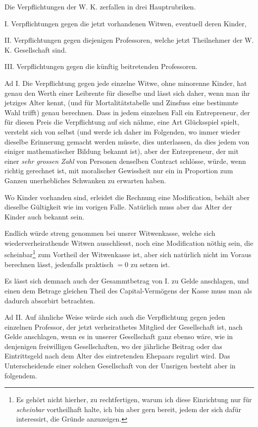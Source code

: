 \par{}
Die Verpflichtungen der W. K. zerfallen in drei Hauptrubriken.

I. Verpflichtungen gegen die jetzt vorhandenen Witwen, eventuell deren Kinder,

II. Verpflichtungen gegen diejenigen Professoren, welche jetzt Theilnehmer der W. K. Gesellschaft sind.

III. Verpflichtungen gegen die künftig beitretenden Professoren.

Ad I. Die Verpflichtung gegen jede einzelne Witwe, ohne minorenne Kinder, hat genau den Werth einer Leibrente für dieselbe und lässt sich daher, wenn man ihr jetziges Alter kennt, (und für Mortalitätstabelle und Zinsfuss eine bestimmte Wahl trifft) genau berechnen. Dass in jedem einzelnen Fall ein Entrepreneur, der für diesen Preis die Verpflichtung auf sich nähme, eine Art Glücksspiel spielt, versteht sich von selbst (und werde ich daher im Folgenden, wo immer wieder dieselbe Erinnerung gemacht werden müsste, dies unterlassen, da dies jedem von einiger mathematischer Bildung bekannt ist), aber der Entrepreneur, der mit einer \textit{sehr grossen Zahl} von Personen denselben Contract schlösse, würde, wenn richtig gerechnet ist, mit moralischer Gewissheit nur ein in Proportion zum Ganzen unerhebliches Schwanken zu erwarten haben.

Wo Kinder vorhanden sind, erleidet die Rechnung eine Modification, behält aber dieselbe Gültigkeit wie im vorigen Falle. Natürlich muss aber das Alter der Kinder auch bekannt sein.

Endlich würde streng genommen bei unsrer Witwenkasse, welche sich wiederverheirathende Witwen ausschliesst, noch eine Modification nöthig sein, die scheinbar\footnote{Es gehört nicht hierher, zu rechtfertigen, warum ich diese Einrichtung nur für \textit{scheinbar} vortheilhaft halte, ich bin aber gern bereit, jedem der sich dafür interessirt, die Gründe anzuzeigen.} zum Vortheil der Witwenkasse ist, aber sich natürlich nicht im Voraus berechnen lässt, jedenfalls praktisch \(=0\) zu setzen ist.

Es lässt sich demnach auch der Gesammtbetrag von I. zu Gelde anschlagen, und einen dem Betrage gleichen Theil des Capital-Vermögens der Kasse muss man als dadurch absorbirt betrachten.

Ad II. Auf ähnliche Weise würde sich auch die Verpflichtung gegen jeden einzelnen Professor, der jetzt verheirathetes Mitglied der Gesellschaft ist, nach Gelde anschlagen, wenn es in unserer Gesellschaft ganz ebenso wäre, wie in denjenigen freiwilligen Gesellschaften, wo der jährliche Beitrag oder das Eintrittsgeld nach dem Alter des eintretenden Ehepaars regulirt wird. Das Unterscheidende einer solchen Gesellschaft von der Unsrigen besteht aber in folgendem.

